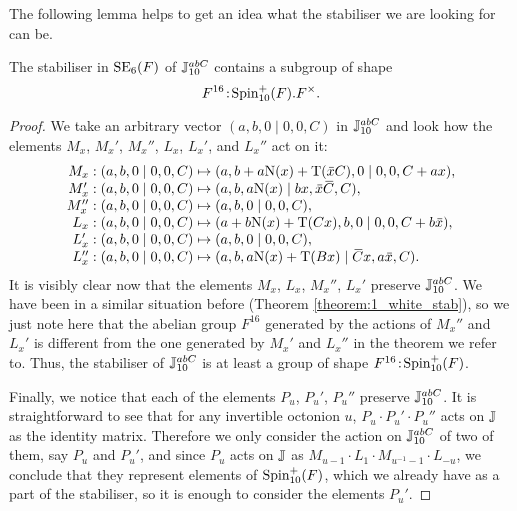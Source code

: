 The following lemma helps to get an idea what the stabiliser
we are looking for can be. 

\begin{lemma}
	\label{lemma:1_white_space_stab}
	The stabiliser in $\mathrm{SE}_6(F)$ of $\mathbb{J}_{10}^{abC}$ contains
	a subgroup of shape 
	\begin{equation}
		F^{16}\mathord{{\;\!{:}\;\!}}\mathrm{Spin}_{10}^+(F).F^{\times}.
	\end{equation}
\end{lemma}

\begin{proof}
	We take an arbitrary vector $(a,b,0 \mid 0,0,C)$ in 
	$\mathbb{J}_{10}^{abC}$ and look how the elements $M_x$, $M_x'$,
	$M_x''$, $L_x$, $L_x'$, and $L_x''$ act on it:
	\begin{equation*}
		\begin{array}{r@{\;}c@{\;}l}
			M_x: (a,b,0\mid 0,0,C) & \mapsto & 
				(a, b + a\NN(x) + \Tr(\ovx C), 0 \mid
					0,0, C + a x), \\
			
			M_x': (a,b,0\mid 0,0,C) & \mapsto & 
				(a, b, a \NN(x) \mid b x, \ovx \ovC, C), \\
				
			M_x'': (a,b,0 \mid 0,0,C) & \mapsto & 
				(a, b, 0 \mid 0, 0, C), \\
				
			L_x: (a,b,0 \mid 0,0,C) & \mapsto & 
				(a + b\NN(x) + \Tr(Cx), b, 0 \mid
					0, 0, C + b\ovx), \\
					
			L_x': (a,b,0 \mid 0,0,C) & \mapsto & 
				(a, b, 0 \mid 0,0,C), \\
				
			L_x'': (a,b,0 \mid 0,0,C) & \mapsto & 
				(a, b, a\NN(x) + \Tr(B x) \mid
					\ovC x, a\ovx, C).
		\end{array}
	\end{equation*}
	It is visibly clear now that the elements $M_x$, $L_x$,
	$M_x''$, $L_x'$ preserve $\mathbb{J}_{10}^{abC}$. We have been in 
	a similar situation before 
	(Theorem \ref{theorem:1_white_stab}), so we just note here
	that the abelian group $F^{16}$ generated by the actions of
	$M_x''$ and $L_x'$ is different from the one generated by
	$M_x'$ and $L_x''$ in the theorem we refer to. Thus, 
	the stabiliser of $\mathbb{J}_{10}^{abC}$ is at least a group of
	shape $F^{16}\mathord{{\;\!{:}\;\!}}\mathrm{Spin}_{10}^+(F)$. 
	
	Finally, we notice that each of the elements $P_u$, $P_u'$,
	$P_u''$ preserve $\mathbb{J}_{10}^{abC}$. It is straightforward to see
	that for any invertible octonion $u$, $P_u \cdot P_u' \cdot
	P_u''$ acts on $\mathbb{J}$ as the identity matrix. Therefore we only
	consider the action on $\mathbb{J}_{10}^{abC}$ of two of them, say
	$P_u$ and $P_u'$, and since $P_u$ acts on $\mathbb{J}$ as
	$M_{u-1} \cdot L_1 \cdot M_{u^{-1}-1} \cdot L_{-u}$, 
	we conclude that they represent elements of 
	$\mathrm{Spin}_{10}^+(F)$, which we already have as a part of the 
	stabiliser, so it is enough to consider the elements $P_u'$.
	

\end{proof}
